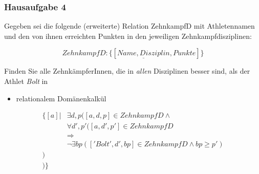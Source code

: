 \begin{frame}[fragile]
	\frametitle{Hausaufgabe 4}
	\vspace{0.5cm}

	\begin{multicols}{2}
		Gegeben sei die folgende (erweiterte) Relation ZehnkampfD mit 
		Athletennamen und den von ihnen erreichten Punkten in den jeweiligen Zehnkampfdisziplinen:

		\[ ZehnkampfD: \{[ \underline{Name, Disziplin}, Punkte ]\} \]

		Finden Sie alle ZehnkämpferInnen, die in \textit{allen} Disziplinen besser sind,
		als der Athlet \textit{Bolt} in
		\begin{itemize}
			\item relationalem Domänenkalkül
		\end{itemize}
		\vfill\columnbreak

		\begin{align*}
			\{ [a] | & \exists d,p ([a, d, p] \in ZehnkampfD \wedge \\
					 & \forall d', p' ([a, d', p'] \in ZehnkampfD \\
					 & \Rightarrow \\
					 & \neg \exists bp (['Bolt', d', bp] \in ZehnkampfD \wedge bp \geq p') \\
					) \\
			)
			 \}
		\end{align*}
	\end{multicols}
\end{frame}


